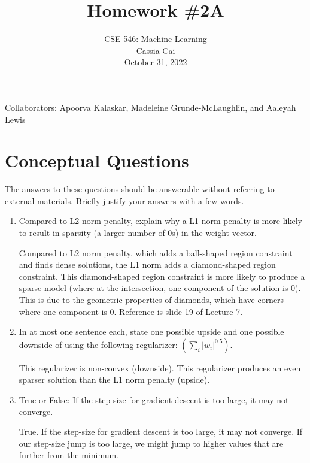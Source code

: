 \documentclass{article}
\begin{document}
\setcounter{aprob}{0}
\title{Homework \#2A}
\author{
    \normalsize{CSE 546: Machine Learning}\\
    \normalsize{Cassia Cai}\\
    \normalsize{October 31, 2022}\\
}
\date{{}}
\maketitle

Collaborators: Apoorva Kalaskar, Madeleine Grunde-McLaughlin, and Aaleyah Lewis

\section*{Conceptual Questions}

\begin{aprob}
    The answers to these questions should be answerable without referring to external materials.
    Briefly justify your answers with a few words.
    \begin{enumerate}
      \item {} Compared to L2 norm penalty, explain why a L1 norm penalty is more likely to result in sparsity (a larger number of 0s) in the weight vector.
      
      Compared to L2 norm penalty, which adds a ball-shaped region constraint and finds dense solutions, the L1 norm adds a diamond-shaped region constraint. This diamond-shaped region constraint is more likely to produce a sparse model (where at the intersection, one component of the solution is 0). This is due to the geometric properties of diamonds, which have corners where one component is 0. Reference is slide 19 of Lecture 7.
      
      \item {} In at most one sentence each, state one possible upside and one possible downside of using the following regularizer: $\left(\sum_{i}\left|w_{i}\right|^{0.5}\right)$.
      
      This regularizer is non-convex (downside). This regularizer produces an even sparser solution than the L1 norm penalty (upside).
      
      \item {} True or False: If the step-size for gradient descent is too large, it may not converge.
      
      True. If the step-size for gradient descent is too large, it may not converge. If our step-size jump is too large, we might jump to higher values that are further from the minimum.
      

\end{enumerate}
\end{aprob}
\end{document}
